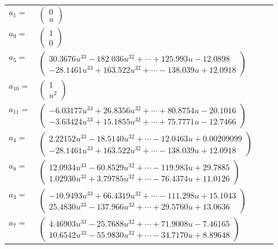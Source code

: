 \documentclass[1p]{elsarticle_modified}
\theoremstyle{definition}
\begin{document}
\begin{tabular}{m{7pt} m{180pt} m{7pt} m{180pt} }
\flushright $a_{1}=$&$\begin{pmatrix}0\\u\end{pmatrix}$ \\
\flushright $a_{9}=$&$\begin{pmatrix}1\\0\end{pmatrix}$ \\
\flushright $a_{5}=$&$\begin{pmatrix}30.3676 u^{33}-182.036 u^{32}+\cdots+125.993 u-12.0898\\-28.1461 u^{33}+163.522 u^{32}+\cdots-138.039 u+12.0918\end{pmatrix}$ \\
\flushright $a_{10}=$&$\begin{pmatrix}1\\u^2\end{pmatrix}$ \\
\flushright $a_{11}=$&$\begin{pmatrix}-6.03177 u^{33}+26.8356 u^{32}+\cdots+80.8754 u-20.1016\\-3.63424 u^{33}+15.1855 u^{32}+\cdots+75.7771 u-12.7466\end{pmatrix}$ \\
\flushright $a_{4}=$&$\begin{pmatrix}2.22152 u^{33}-18.5140 u^{32}+\cdots-12.0463 u+0.00209099\\-28.1461 u^{33}+163.522 u^{32}+\cdots-138.039 u+12.0918\end{pmatrix}$ \\
\flushright $a_{8}=$&$\begin{pmatrix}12.0934 u^{33}-60.8529 u^{32}+\cdots-119.983 u+29.7885\\1.02930 u^{33}+3.79785 u^{32}+\cdots-76.4374 u+11.0126\end{pmatrix}$ \\
\flushright $a_{3}=$&$\begin{pmatrix}-10.9493 u^{33}+66.4319 u^{32}+\cdots-111.298 u+15.1043\\25.4830 u^{33}-137.966 u^{32}+\cdots+29.5760 u+13.0636\end{pmatrix}$ \\
\flushright $a_{7}=$&$\begin{pmatrix}4.46903 u^{33}-25.7688 u^{32}+\cdots+71.9008 u-7.46165\\10.6542 u^{33}-55.9830 u^{32}+\cdots-34.7170 u+8.89648\end{pmatrix}$ \\

\end{tabular}
\end{document}
